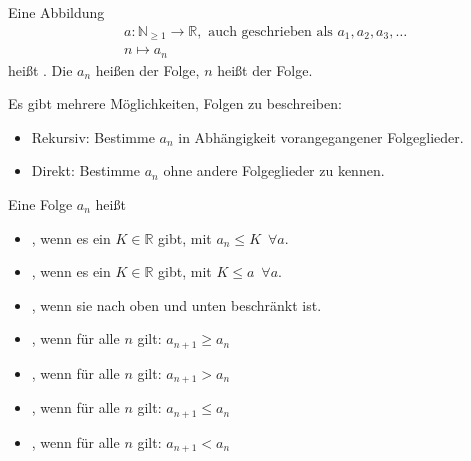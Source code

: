 
Eine Abbildung
\begin{align*}
	&a : \mathbb{N}_{\geq 1} \rightarrow \mathbb{R},\text{ auch geschrieben als } a_1, a_2, a_3, \dots \\
	&n \mapsto a_n
\end{align*}
heißt . Die $a_n$ heißen  der Folge, $n$ heißt  der Folge.

Es gibt mehrere Möglichkeiten, Folgen zu beschreiben:
\begin{itemize}
	\item{Rekursiv: Bestimme $a_n$ in Abhängigkeit vorangegangener Folgeglieder.}
	\item{Direkt: Bestimme $a_n$ ohne andere Folgeglieder zu kennen.}
\end{itemize}

Eine Folge $a_n$ heißt
\begin{itemize}
	\item{, wenn es ein $K \in \mathbb{R}$ gibt, mit $a_n \leq K \enspace\forall a$.}
	\item{, wenn es ein $K \in \mathbb{R}$ gibt, mit $K \leq a \enspace\forall a$.}
	\item{, wenn sie nach oben und unten beschränkt ist.}
	\item{, wenn für alle $n$ gilt: $a_{n+1} \geq a_n$}
	\item{, wenn für alle $n$ gilt: $a_{n+1} > a_n$}
	\item{, wenn für alle $n$ gilt: $a_{n+1} \leq a_n$}
	\item{, wenn für alle $n$ gilt: $a_{n+1} < a_n$}
\end{itemize}

